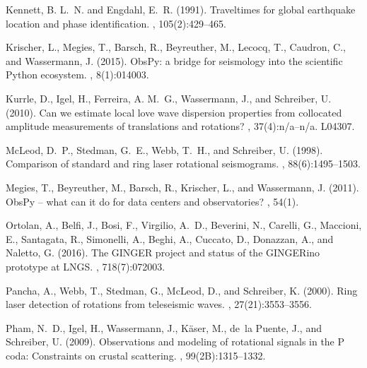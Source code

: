 \documentclass[12pt,reqno,letter]{article}
\begin{document}
\begin{thebibliography}{}
Kennett, B. L.~N. and Engdahl, E.~R. (1991).
\newblock Traveltimes for global earthquake location and phase identification.
, 105(2):429--465.

Krischer, L., Megies, T., Barsch, R., Beyreuther, M., Lecocq, T., Caudron, C.,
  and Wassermann, J. (2015).
\newblock Obs{P}y: a bridge for seismology into the scientific {P}ython ecosystem.
, 8(1):014003.

Kurrle, D., Igel, H., Ferreira, A. M.~G., Wassermann, J., and Schreiber, U.
  (2010).
\newblock Can we estimate local love wave dispersion properties from collocated
  amplitude measurements of translations and rotations?
, 37(4):n/a--n/a.
\newblock L04307.

McLeod, D.~P., Stedman, G.~E., Webb, T.~H., and Schreiber, U. (1998).
\newblock Comparison of standard and ring laser rotational seismograms.
,
  88(6):1495--1503.

Megies, T., Beyreuther, M., Barsch, R., Krischer, L., and Wassermann, J.
  (2011).
\newblock Obs{P}y – what can it do for data centers and observatories?
, 54(1).

Ortolan, A., Belfi, J., Bosi, F., Virgilio, A.~D., Beverini, N., Carelli, G.,
  Maccioni, E., Santagata, R., Simonelli, A., Beghi, A., Cuccato, D., Donazzan,
  A., and Naletto, G. (2016).
\newblock The {GINGER} project and status of the {GINGER}ino prototype at {LNGS}.
, 718(7):072003.

Pancha, A., Webb, T., Stedman, G., McLeod, D., and Schreiber, K. (2000).
\newblock Ring laser detection of rotations from teleseismic waves.
, 27(21):3553--3556.

Pham, N.~D., Igel, H., Wassermann, J., Käser, M., de~la Puente, J., and
  Schreiber, U. (2009).
\newblock Observations and modeling of rotational signals in the {P} coda:
  Constraints on crustal scattering.
,
  99(2B):1315--1332.


\end{thebibliography}
\end{document}
